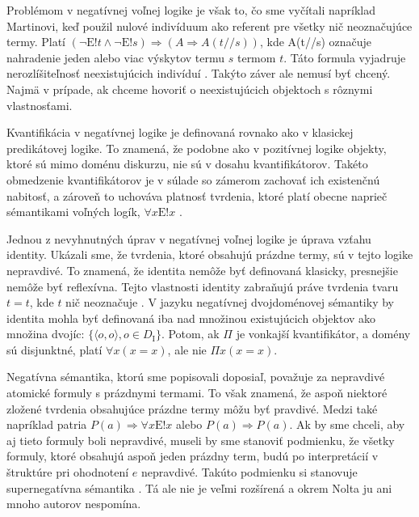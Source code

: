 \documentclass[12pt, letterpaper]{article}
\begin{document}
Problémom v negatívnej voľnej logike je však to, čo sme vyčítali napríklad Martinovi, keď použil nulové indivíduum ako referent pre všetky nič neoznačujúce termy. Platí $(\neg \text{E}!t \land \neg \text{E}!s) \Rightarrow (A \Rightarrow A(t//s))$, kde A(t//s) označuje nahradenie jeden alebo viac výskytov termu $s$ termom $t$. Táto formula vyjadruje nerozlíšiteľnosť neexistujúcich indivíduí \parencites[1033]{Nolt2007}[]{sep-logic-free}. Takýto záver ale nemusí byť chcený. Najmä v prípade, ak chceme hovoriť o neexistujúcich objektoch s rôznymi vlastnosťami.\par
Kvantifikácia v negatívnej logike je definovaná rovnako ako v klasickej predikátovej logike. To znamená, že podobne ako v pozitívnej logike objekty, ktoré sú mimo doménu diskurzu, nie sú v dosahu kvantifikátorov. Takéto obmedzenie kvantifikátorov je v súlade so zámerom zachovať ich existenčnú nabitosť, a zároveň to uchováva platnosť tvrdenia, ktoré platí obecne naprieč sémantikami voľných logík, $\forall x \text{E}! x$ \parencites[]{sep-logic-free}.\par

Jednou z nevyhnutných úprav v negatívnej voľnej logike je úprava vzťahu identity. Ukázali sme, že tvrdenia, ktoré obsahujú prázdne termy, sú v tejto logike nepravdivé. To znamená, že identita nemôže byť definovaná klasicky, presnejšie nemôže byť reflexívna. Tejto vlastnosti identity zabraňujú práve tvrdenia tvaru $t = t$, kde $t$ nič neoznačuje \parencites[172]{Bencivenga2002}[127]{Pavlovic2020}[297]{Priest_2008}. V jazyku negatívnej dvojdoménovej sémantiky by identita mohla byť definovaná iba nad množinou existujúcich objektov ako množina dvojíc: $\{\langle o,o \rangle, o \in D_{\text{I}}\}$. Potom, ak $\Pi$ je vonkajší kvantifikátor, a domény sú disjunktné, platí $\forall x (x = x)$, ale nie $\Pi x (x = x)$.\par

Negatívna sémantika, ktorú sme popisovali doposiaľ, považuje za nepravdivé atomické formuly s prázdnymi termami. To však znamená, že aspoň niektoré zložené tvrdenia obsahujúce prázdne termy môžu byť pravdivé. Medzi také napríklad patria $P(a) \Rightarrow \forall x \text{E}! x$ alebo $P(a) \Rightarrow P(a)$. Ak by sme chceli, aby aj tieto formuly boli nepravdivé, museli by sme stanoviť podmienku, že všetky formuly, ktoré obsahujú aspoň jeden prázdny term, budú po interpretácií v štruktúre pri ohodnotení $e$ nepravdivé. Takúto podmienku si stanovuje supernegatívna sémantika \parencites[1034]{Nolt2007}. Tá ale nie je veľmi rozšírená a okrem Nolta ju ani mnoho autorov nespomína.
\end{document}
